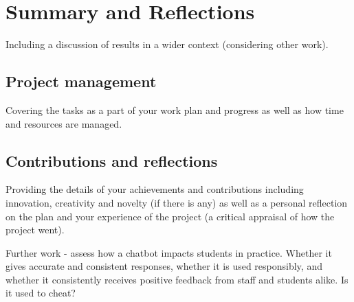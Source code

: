 \chapter{Summary and Reflections}

\label{ch:summary}

Including a discussion of results in a wider context (considering other work).


\section{Project management}

Covering the tasks as a part of your work plan and progress as well as how time and resources are managed.


\section{Contributions and reflections}

Providing the details of your achievements and contributions including innovation, creativity and novelty (if there is any) as well as a personal reflection on the plan and your experience of the project (a critical appraisal of how the project went).

Further work - assess how a chatbot impacts students in practice. Whether it gives accurate and consistent responses, whether it is used responsibly, and whether it consistently receives positive feedback from staff and students alike. Is it used to cheat?
